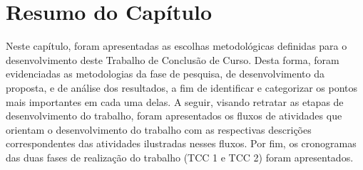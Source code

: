 \section{Resumo do Capítulo}
\label{sec:resumo_metodologia}
Neste capítulo, foram apresentadas as escolhas metodológicas definidas para o desenvolvimento deste Trabalho de Conclusão de Curso. Desta forma, foram evidenciadas as metodologias da fase de pesquisa, de desenvolvimento da proposta, e de análise dos resultados, a fim de identificar e categorizar os pontos mais importantes em cada uma delas. A seguir, visando retratar as etapas de desenvolvimento do trabalho, foram apresentados os fluxos de atividades que orientam o desenvolvimento do trabalho com as respectivas descrições correspondentes das atividades ilustradas nesses fluxos. Por fim, os cronogramas das duas fases de realização do trabalho (TCC 1 e TCC 2) foram apresentados.